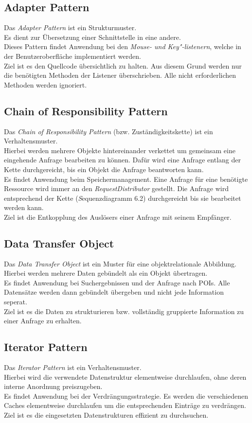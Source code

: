 \documentclass[10pt]{scrreprt}
\newcommand{\textref}[1]{\mbox{\raisebox{0.1ex}{\small$\rightarrow$ }\textit{#1}}}
\begin{document}
\subsection{Adapter Pattern}
Das \textit{Adapter Pattern} ist ein Strukturmuster. \\
Es dient zur Übersetzung einer Schnittstelle in eine andere. \\ Dieses Pattern findet Anwendung bei den \textit{Mouse- und Key"-listenern}, welche in der Benutzeroberfläche implementiert werden. \\ Ziel ist es den Quellcode übersichtlich zu halten. Aus diesem Grund werden nur die benötigten Methoden der Listener überschrieben. Alle nicht erforderlichen Methoden werden ignoriert.

\subsection{Chain of Responsibility Pattern}
Das \textit{Chain of Responsibility Pattern} (bzw. Zuständigkeitskette) ist ein Verhaltensmuster. \\
Hierbei werden mehrere Objekte hintereinander verkettet um gemeinsam eine eingehende Anfrage bearbeiten zu können. Dafür wird eine Anfrage entlang der Kette durchgereicht, bis ein Objekt die Anfrage beantworten kann. \\ Es findet Anwendung beim Speichermanagement. Eine Anfrage für eine benötigte Ressource wird immer an den \textit{RequestDistributor} gestellt. Die Anfrage wird entsprechend der Kette (\textref Sequenzdiagramm 6.2) durchgereicht bis sie bearbeitet werden kann. \\ Ziel ist die Entkopplung des Auslösers einer Anfrage mit seinem Empfänger.

\subsection{Data Transfer Object}
Das \textit{Data Transfer Object} ist ein Muster für eine objektrelationale Abbildung. \\
Hierbei werden mehrere Daten gebündelt als ein Objekt übertragen. \\ Es findet Anwendung bei Suchergebnissen und der Anfrage nach POIs. Alle Datensätze werden dann gebündelt übergeben und nicht jede Information seperat. \\ Ziel ist es die Daten zu strukturieren bzw. vollständig gruppierte Information zu einer Anfrage zu erhalten.

\subsection{Iterator Pattern}
Das \textit{Iterator Pattern} ist ein Verhaltensmuster.\\ Hierbei wird die verwendete Datenstruktur elementweise durchlaufen, ohne deren interne Anordnung preiszugeben.\\ Es findet Anwendung bei der Verdrängungsstrategie. Es werden die verschiedenen Caches elementweise durchlaufen um die entsprechenden Einträge zu verdrängen.\\
Ziel ist es die eingesetzten Datenstrukturen effizient zu durchsuchen.
\end{document}
